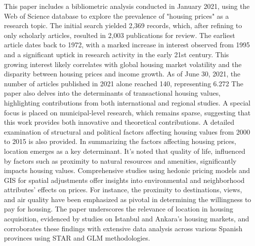 \documentclass{aip-cp}
\begin{document}
This paper includes a bibliometric analysis conducted in January 2021, using the Web of Science database to explore the prevalence of "housing prices" as a research topic. The initial search yielded 2,369 records, which, after refining to only scholarly articles, resulted in 2,003 publications for review. The earliest article dates back to 1972, with a marked increase in interest observed from 1995 and a significant uptick in research activity in the early 21st century. This growing interest likely correlates with global housing market volatility and the disparity between housing prices and income growth.
As of June 30, 2021, the number of articles published in 2021 alone reached 140, representing 6.272%
The paper also delves into the determinants of transactional housing values, highlighting contributions from both international and regional studies. A special focus is placed on municipal-level research, which remains sparse, suggesting that this work provides both innovative and theoretical contributions. A detailed examination of structural and political factors affecting housing values from 2000 to 2015 is also provided.
In summarizing the factors affecting housing prices, location emerges as a key determinant. It's noted that quality of life, influenced by factors such as proximity to natural resources and amenities, significantly impacts housing values. Comprehensive studies using hedonic pricing models and GIS for spatial adjustments offer insights into environmental and neighborhood attributes' effects on prices. For instance, the proximity to destinations, views, and air quality have been emphasized as pivotal in determining the willingness to pay for housing. The paper underscores the relevance of location in housing acquisition, evidenced by studies on Istanbul and Ankara's housing markets, and corroborates these findings with extensive data analysis across various Spanish provinces using STAR and GLM methodologies.
\end{document}
